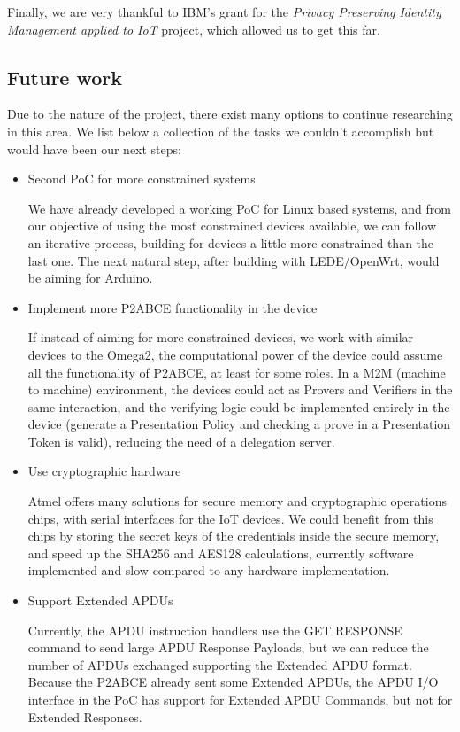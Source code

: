 \documentclass[journal]{IEEEtran}
\begin{document}
Finally, we are very thankful to IBM's grant for the \textit{Privacy Preserving Identity Management applied to IoT} project, which allowed us to get this far. 


\subsection{Future work}


Due to the nature of the project, there exist many options to continue researching in this area. We list below a collection of the tasks we couldn't accomplish but would have been our next steps:

\begin{itemize}
	\item Second PoC for more constrained systems
	
	We have already developed a working PoC for Linux based systems, and from our objective of using the most constrained devices available, we can follow an iterative process, building for devices a little more constrained than the last one. The next natural step, after building with LEDE/OpenWrt, would be aiming for Arduino.
	
	\item Implement more P2ABCE functionality in the device
	
	If instead of aiming for more constrained devices, we work with similar devices to the Omega2, the computational power of the device could assume all the functionality of P2ABCE, at least for some roles. In a M2M (machine to machine) environment, the devices could act as Provers and Verifiers in the same interaction, and the verifying logic could be implemented entirely in the device (generate a Presentation Policy and checking a prove in a Presentation Token is valid), reducing the need of a delegation server.
	
	
	\item Use cryptographic hardware
	
	Atmel offers many solutions for secure memory and cryptographic operations chips, with serial interfaces for the IoT devices. We could benefit from this chips by storing the secret keys of the credentials inside the secure memory, and speed up the SHA256 and AES128 calculations, currently software implemented and slow compared to any hardware implementation. 
	
	
	
	\item Support Extended APDUs
	
	Currently, the APDU instruction handlers use the GET RESPONSE command to send large APDU Response Payloads, but we can reduce the number of APDUs exchanged supporting the Extended APDU format. Because the P2ABCE already sent some Extended APDUs, the APDU I/O interface in the PoC has support for Extended APDU Commands, but not for Extended Responses.
	

\end{itemize}
\end{document}
